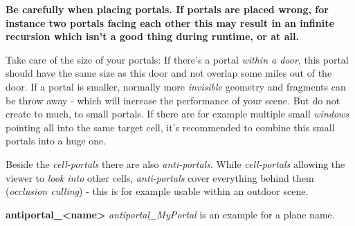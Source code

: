 \textbf{Be carefully when placing portals. If portals are placed wrong, for instance two portals facing each other this may result in an infinite recursion which isn't a good thing during runtime, or at all.}

Take care of the size of your portals: If there's a portal \emph{within a door}, this portal should have the same size as this door and not overlap some miles out of the door. If a portal is smaller, normally more \emph{invisible} geometry and fragments can be throw away - which will increase the performance of your scene.
But do not create to much, to small portals. If there are for example multiple small \emph{windows} pointing all into the same target cell, it's recommended to combine this small portals into a huge one.

Beside the \emph{cell-portals} there are also \emph{anti-portals}. While \emph{cell-portals} allowing the viewer to \emph{look into} other cells, \emph{anti-portals} cover everything behind them (\emph{occlusion culling}) - this is for example usable within an outdoor scene.

\textbf{antiportal\_<name>}
\emph{antiportal\_MyPortal} is an example for a plane name.
